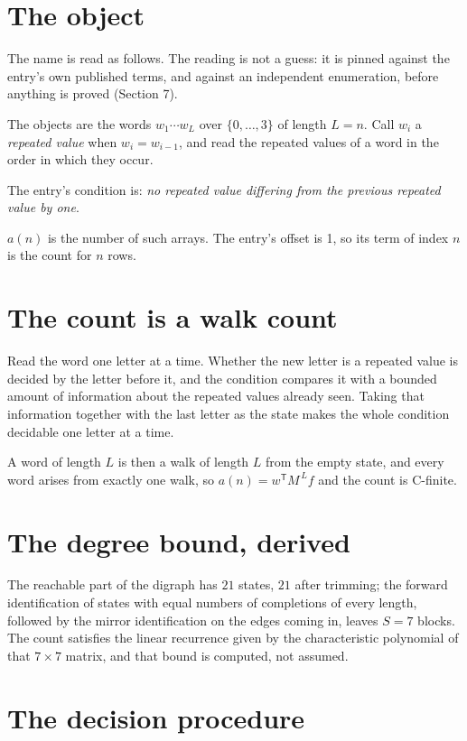 \documentclass[11pt]{article}
\theoremstyle{definition}
\begin{document}
\section{The object}

The name is read as follows. The reading is not a guess: it is pinned against the entry's own published terms, and against an independent enumeration, before anything is proved (Section 7).

The objects are the words $w_1\cdots w_L$ over $\{0,\dots,3\}$ of length $L = n$. Call $w_i$ a {\itshape repeated value} when $w_i = w_{i-1}$, and read the repeated values of a word in the order in which they occur.

The entry's condition is: {\itshape no repeated value differing from the previous repeated value by one}.

$a(n)$ is the number of such arrays. The entry's offset is 1, so its term of index $n$ is the count for $n$ rows.

\section{The count is a walk count}

Read the word one letter at a time. Whether the new letter is a repeated value is decided by the letter before it, and the condition compares it with a bounded amount of information about the repeated values already seen. Taking that information together with the last letter as the state makes the whole condition decidable one letter at a time.

A word of length $L$ is then a walk of length $L$ from the empty state, and every word arises from exactly one walk, so $a(n) = w^{\mathsf T}M^{\,L}f$ and the count is C-finite.

\section{The degree bound, derived}

The reachable part of the digraph has $21$ states, $21$ after trimming; the forward identification of states with equal numbers of completions of every length, followed by the mirror identification on the edges coming in, leaves $S = 7$ blocks. The count satisfies the linear recurrence given by the characteristic polynomial of that $7\times7$ matrix, and that bound is computed, not assumed.

\section{The decision procedure}
\end{document}
